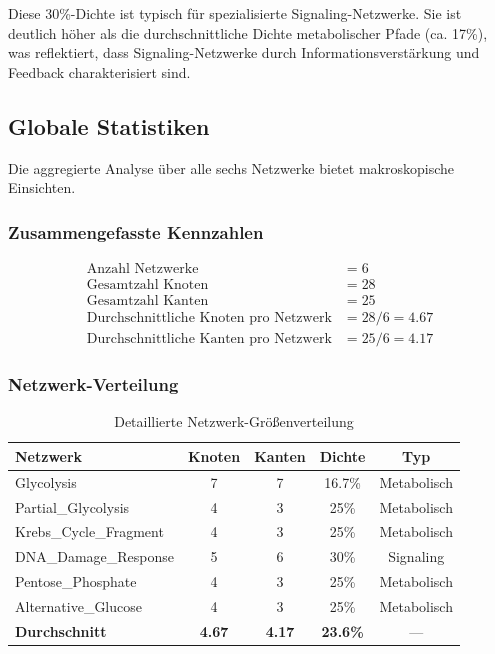 ﻿\documentclass[a4paper,12pt]{article}
\theoremstyle{definition}
\begin{document}
Diese 30\%-Dichte ist typisch für spezialisierte Signaling-Netzwerke. Sie ist deutlich höher als die durchschnittliche Dichte metabolischer Pfade (ca. 17\%), was reflektiert, dass Signaling-Netzwerke durch Informationsverstärkung und Feedback charakterisiert sind.

\subsection{Globale Statistiken}

Die aggregierte Analyse über alle sechs Netzwerke bietet makroskopische Einsichten.

\subsubsection{Zusammengefasste Kennzahlen}

\begin{align*}
	\text{Anzahl Netzwerke} &= 6 \\
	\text{Gesamtzahl Knoten} &= 28 \\
	\text{Gesamtzahl Kanten} &= 25 \\
	\text{Durchschnittliche Knoten pro Netzwerk} &= 28 / 6 = 4.67 \\
	\text{Durchschnittliche Kanten pro Netzwerk} &= 25 / 6 = 4.17
\end{align*}

\subsubsection{Netzwerk-Verteilung}

\begin{table}[h]
	\centering
	\caption{Detaillierte Netzwerk-Größenverteilung}
	\label{tab:network_distribution}
	\begin{tabular}{|l|c|c|c|c|}
		\hline
		\textbf{Netzwerk} & \textbf{Knoten} & \textbf{Kanten} & \textbf{Dichte} & \textbf{Typ} \\
		\hline
		Glycolysis & 7 & 7 & 16.7\% & Metabolisch \\
		Partial\_Glycolysis & 4 & 3 & 25\% & Metabolisch \\
		Krebs\_Cycle\_Fragment & 4 & 3 & 25\% & Metabolisch \\
		DNA\_Damage\_Response & 5 & 6 & 30\% & Signaling \\
		Pentose\_Phosphate & 4 & 3 & 25\% & Metabolisch \\
		Alternative\_Glucose & 4 & 3 & 25\% & Metabolisch \\
		\hline
		\textbf{Durchschnitt} & \textbf{4.67} & \textbf{4.17} & \textbf{23.6\%} & --- \\
		\hline
	\end{tabular}
\end{table}
\end{document}
